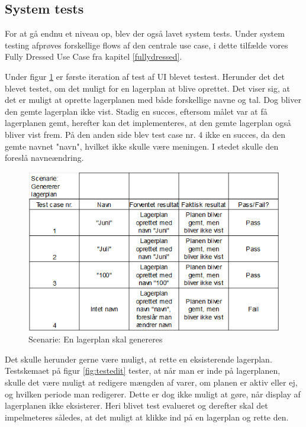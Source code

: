 \subsection{System tests}
For at gå endnu et niveau op, blev der også lavet system tests\cite{TestLevels}. Under system testing afprøves forskellige flows af den centrale use case, i dette tilfælde vores Fully Dressed Use Case fra kapitel \ref{fullydressed}.

Under figur \ref{fig:testgenerate} er første iteration af test af UI blevet testest. Herunder det det blevet testet, om det muligt for en lagerplan at blive oprettet. Det viser sig, at det er muligt at oprette lagerplanen med både forskellige navne og tal. Dog bliver den gemte lagerplan ikke vist. Stadig en succes, eftersom målet var at få lagerplanen gemt, herefter kan det implementeres, at den gemte lagerplan også bliver vist frem. På den anden side blev test case nr. 4 ikke en succes, da den gemte navnet "navn", hvilket ikke skulle være meningen. I stedet skulle den foreslå navneændring.

\begin{figure}[p]
    \centering
    \includegraphics[width=0.8\hsize]{figures/tests/test_generer_plan.png}
    \caption{Scenarie: En lagerplan skal genereres}
    \label{fig:testgenerate}
\end{figure}

Det skulle herunder gerne være muligt, at rette en eksisterende lagerplan. Testskemaet på figur \ref{fig:testedit} tester, at når man er inde på lagerplanen, skulle det være muligt at redigere mængden af varer, om planen er aktiv eller ej, og hvilken periode man redigerer.  Dette er dog ikke muligt at gøre, når display af lagerplanen ikke eksisterer. Heri blivet test evalueret og derefter skal det impelmeteres således, at det muligt at klikke ind på en lagerplan og rette den. 

